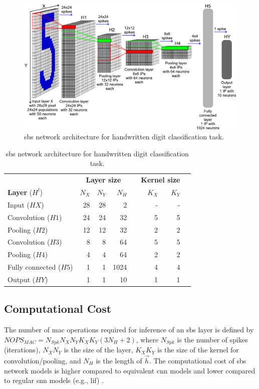\begin{figure}[b!]
	\centering
	\includegraphics[width=0.5\columnwidth]{./chapters/sbs_accelerator/figures/sbs_network.pdf}
	\caption{\gls{sbs} network architecture for handwritten digit classification task.}
	\label{fig:sbs_network}
\end{figure}


\begin{table}[t!]\centering
	\caption{\gls{sbs} network architecture for handwritten digit classification task.}
	\label{tab:sbs_network}
	\scriptsize
	\begin{tabular}{lrrrrrrr}\toprule
		&\multicolumn{3}{c}{\textbf{Layer size}} & &\multicolumn{2}{c}{\textbf{Kernel size}} \\\cmidrule{2-4}\cmidrule{6-7}
		\textbf{Layer} ($H^l$) &$N_X$ &$N_Y$ &$N_H$ & &$K_X$ &$K_Y$ \\\midrule
		Input ($HX$) &28 &28 &2 & &- &- \\
		Convolution ($H1$) &24 &24 &32 & &5 &5 \\
		Pooling ($H2$) &12 &12 &32 & &2 &2 \\
		Convolution ($H3$) &8 &8 &64 & &5 &5 \\
		Pooling ($H4$) &4 &4 &64 & &2 &2 \\
		Fully connected ($H5$) &1 &1 &1024 & &4 &4 \\
		Output ($HY$) &1 &1 &10 & &1 &1 \\
		\bottomrule
	\end{tabular}
\end{table}

\subsection{Computational Cost}

The number of \gls{mac} operations required for inference of an \gls{sbs} layer is defined by $NOPS_{MAC}=N_{Spk} N_X N_Y K_X K_Y (3 N_H + 2)$, where $N_{Spk}$ is the number of spikes (iterations), $N_X N_Y$ is the size of the layer, $K_X K_Y$ is the size of the kernel for convolution/pooling, and $N_H$ is the length of $\vec{h}$. The computational cost of \gls{sbs} network models is higher compared to equivalent \gls{cnn} models and lower compared to regular \gls{snn} models (e.g., \gls{lif}) \mbox{\cite{izhikevich2004model}}.


